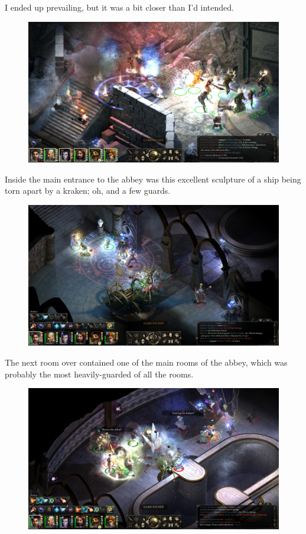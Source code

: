 \documentclass{article}
\begin{document}
I ended up prevailing, but it was a bit closer than I'd intended.

\begin{figure}
\includegraphics[scale=0.33]{files/blog/2020_01_18_poe_potd_wmpt2/2020_01_18_abbey04.jpg}
\end{figure}

Inside the main entrance to the abbey was this excellent sculpture of a ship being torn apart by a kraken; oh, and a few guards.

\begin{figure}
\includegraphics[scale=0.33]{files/blog/2020_01_18_poe_potd_wmpt2/2020_01_18_abbey05.jpg}
\end{figure}

The next room over contained one of the main rooms of the abbey, which was probably the most heavily-guarded of all the rooms.

\begin{figure}
\includegraphics[scale=0.33]{files/blog/2020_01_18_poe_potd_wmpt2/2020_01_18_abbey06.jpg}
\end{figure}
\end{document}
